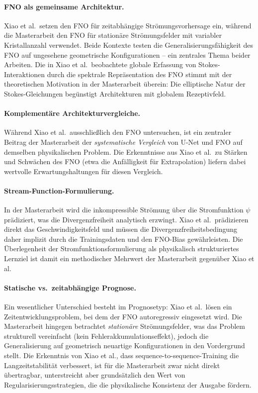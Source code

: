 \documentclass[a4paper,12pt]{article}
\begin{document}
\paragraph{FNO als gemeinsame Architektur.}
Xiao et al.\ setzen den FNO für zeitabhängige Strömungsvorhersage ein,
während die Masterarbeit den FNO für stationäre Strömungsfelder mit variabler
Kristallanzahl verwendet.  Beide Kontexte testen die Generalisierungsfähigkeit
des FNO auf ungesehene geometrische Konfigurationen -- ein zentrales Thema
beider Arbeiten.  Die in Xiao et al.\ beobachtete globale Erfassung von
Stokes-Interaktionen durch die spektrale Repräsentation des FNO stimmt mit
der theoretischen Motivation in der Masterarbeit überein: Die elliptische
Natur der Stokes-Gleichungen begünstigt Architekturen mit globalem
Rezeptivfeld.

\paragraph{Komplementäre Architekturvergleiche.}
Während Xiao et al.\ ausschließlich den FNO untersuchen, ist ein zentraler
Beitrag der Masterarbeit der \emph{systematische Vergleich} von U-Net und
FNO auf demselben physikalischen Problem.  Die Erkenntnisse aus Xiao et al.\
zu Stärken und Schwächen des FNO (etwa die Anfälligkeit für Extrapolation)
liefern dabei wertvolle Erwartungshaltungen für diesen Vergleich.

\paragraph{Stream-Function-Formulierung.}
In der Masterarbeit wird die inkompressible Strömung über die Stromfunktion
$\psi$ prädiziert, was die Divergenzfreiheit analytisch erzwingt.  Xiao et al.\
prädizieren direkt das Geschwindigkeitsfeld und müssen die
Divergenzfreiheitsbedingung daher implizit durch die Trainingsdaten und den
FNO-Bias gewährleisten.  Die Überlegenheit der Stromfunktionsformulierung
als physikalisch strukturiertes Lernziel ist damit ein methodischer
Mehrwert der Masterarbeit gegenüber Xiao et al.

\paragraph{Statische vs.\ zeitabhängige Prognose.}
Ein wesentlicher Unterschied besteht im Prognosetyp: Xiao et al.\ lösen ein
Zeitentwicklungsproblem, bei dem der FNO autoregressiv eingesetzt wird.  Die
Masterarbeit hingegen betrachtet \emph{stationäre} Strömungsfelder, was das
Problem strukturell vereinfacht (kein Fehlerakkumulationseffekt), jedoch die
Generalisierung auf geometrisch neuartige Konfigurationen in den Vordergrund
stellt.  Die Erkenntnis von Xiao et al., dass sequence-to-sequence-Training
die Langzeitstabilität verbessert, ist für die Masterarbeit zwar nicht direkt
übertragbar, unterstreicht aber grundsätzlich den Wert von Regularisierungsstrategien, die die physikalische Konsistenz der Ausgabe fördern.
\end{document}
